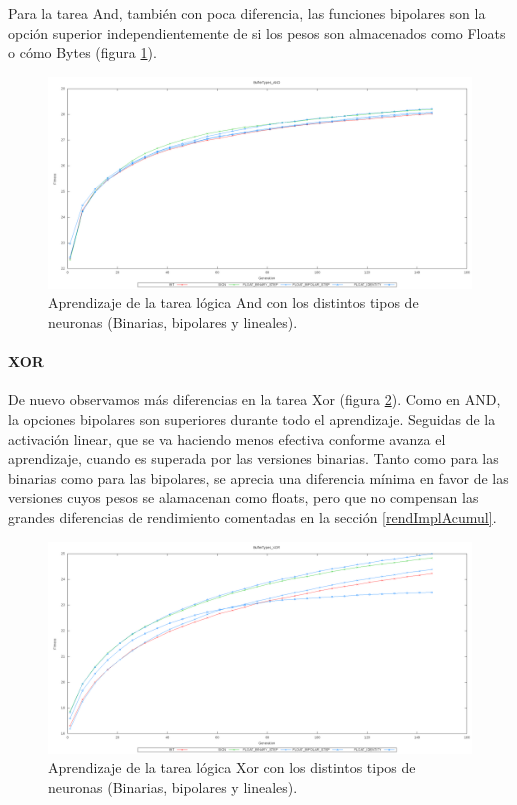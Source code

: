 \documentclass[11pt]{article}
\begin{document}
\begin{titlepage}
Para la tarea And, también con poca diferencia, las funciones bipolares son la opción superior independientemente de si los pesos son almacenados como Floats o cómo Bytes (figura \ref{aprenDiscretAnd}).

\begin{figure}[htb]
\centering
\includegraphics[width=\textwidth]{./img/BufferTypes_AND.png}
\caption{\label{aprenDiscretAnd}Aprendizaje de la tarea lógica And con los distintos tipos de neuronas (Binarias, bipolares y lineales).}
\end{figure}

\newpage
\paragraph{XOR}
\label{sec-6-2-2-3}


De nuevo observamos más diferencias en la tarea Xor (figura \ref{aprenDiscretXor}). Como en AND, la opciones bipolares son superiores durante todo el aprendizaje. Seguidas de la activación linear, que se va haciendo menos efectiva conforme avanza el aprendizaje, cuando es superada por las versiones binarias. Tanto como para las binarias como para las bipolares, se aprecia una diferencia mínima en favor de las versiones cuyos pesos se alamacenan como floats, pero que no compensan las grandes diferencias de rendimiento comentadas en la sección \ref{rendImplAcumul}.

\begin{figure}[htb]
\centering
\includegraphics[width=\textwidth]{./img/BufferTypes_XOR.png}
\caption{\label{aprenDiscretXor}Aprendizaje de la tarea lógica Xor con los distintos tipos de neuronas (Binarias, bipolares y lineales).}
\end{figure}


\end{titlepage}
\end{document}
